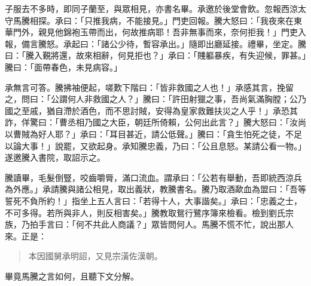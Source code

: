 子服去不多時，即同子蘭至，與眾相見，亦書名畢。承邀於後堂會飲。忽報西涼太守馬騰相探。承曰：「只推我病，不能接見。」門吏回報。騰大怒曰：「我夜來在東華門外，親見他錦袍玉帶而出，何故推病耶！吾非無事而來，奈何拒我！」門吏入報，備言騰怒。承起曰：「諸公少待，暫容承出。」隨即出廳延接。禮畢，坐定。騰曰：「騰入覲將還，故來相辭，何見拒也？」承曰：「賤軀暴疾，有失迎候，罪甚。」騰曰：「面帶春色，未見病容。」

承無言可答。騰拂袖便起，嗟歎下階曰：「皆非救國之人也！」承感其言，挽留之，問曰：「公謂何人非救國之人？」騰曰：「許田射獵之事，吾尚氣滿胸膛；公乃國之至戚，猶自滯於酒色，而不思討賊，安得為皇家救難扶災之人乎！」承恐其詐，佯驚曰：「曹丞相乃國之大臣，朝廷所倚賴，公何出此言？」騰大怒曰：「汝尚以曹賊為好人耶？」承曰：「耳目甚近，請公低聲。」騰曰：「貪生怕死之徒，不足以論大事！」說罷，又欲起身。承知騰忠義，乃曰：「公且息怒。某請公看一物。」遂邀騰入書院，取詔示之。

騰讀畢，毛髮倒豎，咬齒嚼脣，滿口流血。謂承曰：「公若有舉動，吾即統西涼兵為外應。」承請騰與諸公相見，取出義狀，教騰書名。騰乃取酒歃血為盟曰：「吾等誓死不負所約！」指坐上五人言曰：「若得十人，大事諧矣。」承曰：「忠義之士，不可多得。若所與非人，則反相害矣。」騰教取鴛行鷺序簿來檢看。檢到劉氏宗族，乃拍手言曰：「何不共此人商議？」眾皆問何人。馬騰不慌不忙，說出那人來。正是：

\begin{quote}
本因國舅承明詔，又見宗潢佐漢朝。
\end{quote}

畢竟馬騰之言如何，且聽下文分解。
